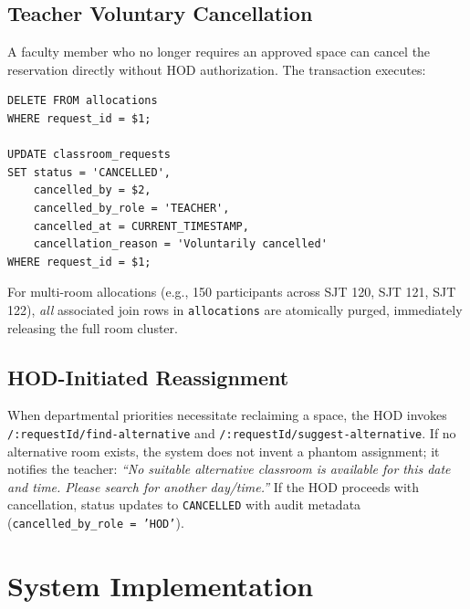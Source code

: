 \documentclass[conference]{IEEEtran}
\begin{document}
\subsection{Teacher Voluntary Cancellation}
A faculty member who no longer requires an approved space can cancel the reservation directly without HOD authorization. The transaction executes:
\begin{verbatim}
DELETE FROM allocations 
WHERE request_id = $1;

UPDATE classroom_requests 
SET status = 'CANCELLED', 
    cancelled_by = $2, 
    cancelled_by_role = 'TEACHER', 
    cancelled_at = CURRENT_TIMESTAMP, 
    cancellation_reason = 'Voluntarily cancelled' 
WHERE request_id = $1;
\end{verbatim}
For multi-room allocations (e.g., 150 participants across SJT 120, SJT 121, SJT 122), \textit{all} associated join rows in \texttt{allocations} are atomically purged, immediately releasing the full room cluster.

\subsection{HOD-Initiated Reassignment}
When departmental priorities necessitate reclaiming a space, the HOD invokes \texttt{/:requestId/find-alternative} and \texttt{/:requestId/suggest-alternative}. If no alternative room exists, the system does not invent a phantom assignment; it notifies the teacher: \textit{``No suitable alternative classroom is available for this date and time. Please search for another day/time.''} If the HOD proceeds with cancellation, status updates to \texttt{CANCELLED} with audit metadata (\texttt{cancelled\_by\_role = 'HOD'}).

\section{System Implementation}
\end{document}
